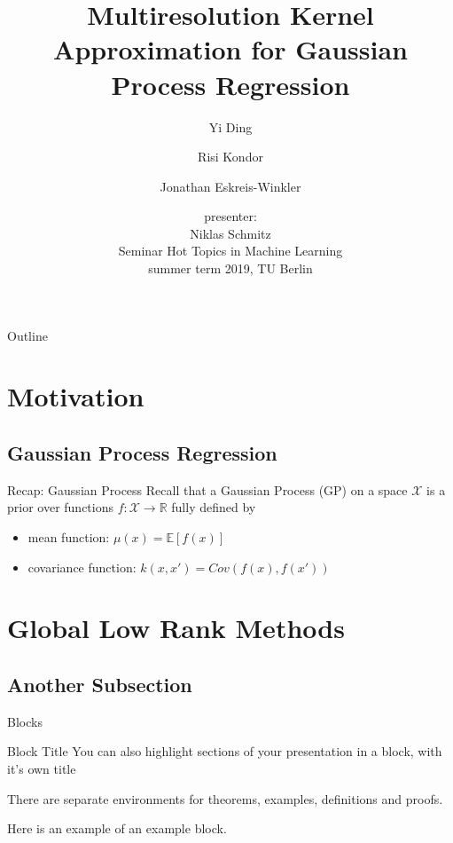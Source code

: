 \documentclass{beamer}
\title{Multiresolution Kernel Approximation for Gaussian Process Regression}
\author{Yi Ding\inst{1} \and Risi Kondor\inst{1}\inst{2} \and Jonathan Eskreis-Winkler\inst{2}}
\institute[Universities of Somewhere and Elsewhere] %
{
  \inst{1}%
  Department of Computer Science\\
  \inst{2}%
  Department of Statistics\\
  The University of Chicago}
\date{presenter:\\
Niklas Schmitz\\
Seminar Hot Topics in Machine Learning\\
summer term 2019, TU Berlin}
\begin{document}
\begin{frame}
  \titlepage
\end{frame}

\begin{frame}{Outline}
  \tableofcontents
\end{frame}


\section{Motivation}

\subsection{Gaussian Process Regression}

\begin{frame}{Recap: Gaussian Process}
  Recall that a Gaussian Process (GP) on a space $\mathcal{X}$ is a prior over functions $f: \mathcal{X}\to \mathbb{R}$ fully defined by\pause
  \begin{itemize}
      \item<2-> mean function: $\mu(x) = \mathbb{E}[f(x)]$
      \item<3-> covariance function: $k(x,x') = Cov(f(x), f(x'))$
  \end{itemize}
\end{frame}

\section{Global Low Rank Methods}
\subsection{Another Subsection}

\begin{frame}{Blocks}
\begin{block}{Block Title}
You can also highlight sections of your presentation in a block, with it's own title
\end{block}
\begin{theorem}
There are separate environments for theorems, examples, definitions and proofs.
\end{theorem}
\begin{example}
Here is an example of an example block.
\end{example}
\end{frame}
\end{document}
